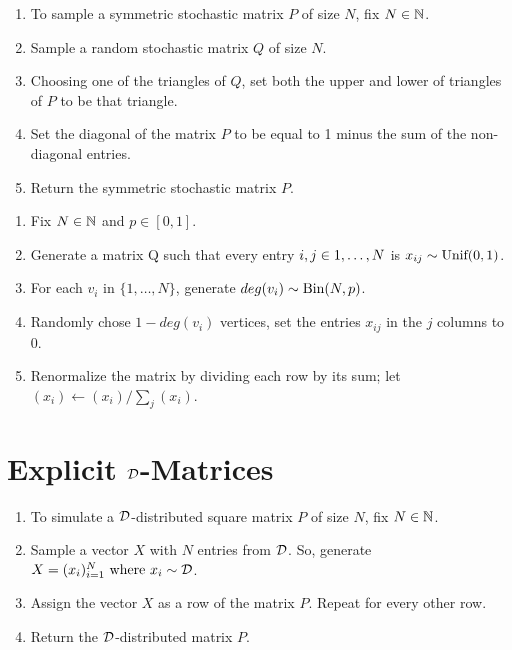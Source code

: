 \begin{algorithm} \hfill
\begin{enumerate}
	\item To sample a symmetric stochastic matrix $P$ of size $N$, fix $N \in \N$.
	\item Sample a random stochastic matrix $Q$ of size $N$.
	\item Choosing one of the triangles of $Q$, set both the upper and lower of triangles of $P$ to be that triangle.
	\item Set the diagonal of the matrix $P$ to be equal to 1 minus the sum of the non-diagonal entries.
	\item Return the symmetric stochastic matrix $P$.
\end{enumerate}
\end{algorithm}

\newpage

\begin{algorithm} \hfill
\begin{enumerate}
	\item{Fix $N \in \N$ and $p \in [0,1]$}.
	\item{Generate a matrix Q such that every entry $i,j\in \oneto[N]$ is $x_{ij} \sim \Unif(0,1)$.}
	\item{For each $v_i$ in $\{1,\dots,N\}$, generate $deg(v_i) \sim \Bin(N,p)$.}
	\item{Randomly chose $1-deg(v_i)$ vertices, set the entries $x_{ij}$ in the $j$ columns to 0.}
	\item{Renormalize the matrix by dividing each row by its sum; let $(x_i) \leftarrow (x_i)/\sum_j(x_i)$}.
\end{enumerate}
\end{algorithm}


\section{Explicit $\D$-Matrices}

\begin{algorithm} \hfill
\begin{enumerate}
	\item To simulate a $\D$-distributed square matrix $P$ of size $N$, fix $N \in \N$.
	\item Sample a vector $X$ with $N$ entries from $\D$. So, generate $X = (x_i)_{i = 1}^N \where x_i \sim \D$.
	\item Assign the vector $X$ as a row of the matrix $P$. Repeat for every other row.
	\item Return the $\D$-distributed matrix $P$.
\end{enumerate}
\end{algorithm}

\dumitriuALGORITHM

